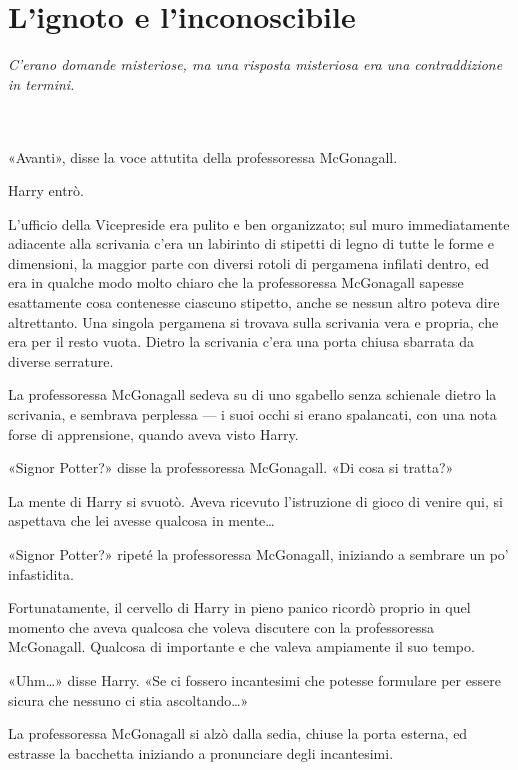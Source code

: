 
\chapter{L’ignoto e l’inconoscibile}
\label{capitolo:14}

\emph{C’erano domande misteriose, ma una risposta misteriosa era una contraddizione in termini.}

~\\
~\\

«Avanti», disse la voce attutita della professoressa McGonagall.

Harry entrò.

L’ufficio della Vicepreside era pulito e ben organizzato; sul muro immediatamente adiacente alla scrivania c’era un labirinto di stipetti di legno di tutte le forme e dimensioni, la maggior parte con diversi rotoli di pergamena infilati dentro, ed era in qualche modo molto chiaro che la professoressa McGonagall sapesse esattamente cosa contenesse ciascuno stipetto, anche se nessun altro poteva dire altrettanto. Una singola pergamena si trovava sulla scrivania vera e propria, che era per il resto vuota. Dietro la scrivania c’era una porta chiusa sbarrata da diverse serrature.

La professoressa McGonagall sedeva su di uno sgabello senza schienale dietro la scrivania, e sembrava perplessa — i suoi occhi si erano spalancati, con una nota forse di apprensione, quando aveva visto Harry.

«Signor Potter?» disse la professoressa McGonagall. «Di cosa si tratta?»

La mente di Harry si svuotò. Aveva ricevuto l’istruzione di gioco di venire qui, si aspettava che lei avesse qualcosa in mente…

«Signor Potter?» ripeté la professoressa McGonagall, iniziando a sembrare un po’ infastidita.

Fortunatamente, il cervello di Harry in pieno panico ricordò proprio in quel momento che aveva qualcosa che voleva discutere con la professoressa McGonagall. Qualcosa di importante e che valeva ampiamente il suo tempo.

«Uhm…» disse Harry. «Se ci fossero incantesimi che potesse formulare per essere sicura che nessuno ci stia ascoltando…»

La professoressa McGonagall si alzò dalla sedia, chiuse la porta esterna, ed estrasse la bacchetta iniziando a pronunciare degli incantesimi.

